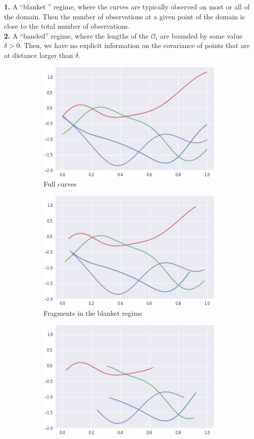 \documentclass[10pt, a4paper]{report}
\theoremstyle{definition}
\theoremstyle{remark}
\begin{document}
\noindent
\textbf{1.} A ``blanket '' regime, where the curves are typically observed on most or all of the domain. Then the number of observations at a given point of the domain is close to the total number of observations.\\
\textbf{2.} A ``banded'' regime, where the lengths of the $\mathcal{O}_i$ are bounded by some value $\delta>0$. Then, we have no explicit information on the covariance of points that are at distance larger than $\delta$.
\begin{figure}[ht]
	\centering
	\begin{subfigure}{.3\textwidth}
		\centering
		\includegraphics[width=.8\linewidth]{Code/images/21/full}
		\caption{Full curves}
	\end{subfigure}%
	\begin{subfigure}{.3\textwidth}
		\centering
		\includegraphics[width=.8\linewidth]{Code/images/21/blanket}
		\caption{\centering Fragments in the blanket regime}
	\end{subfigure}
	\begin{subfigure}{.3\textwidth}
		\centering
		\includegraphics[width=.8\linewidth]{Code/images/21/frags}

\end{subfigure}
\end{figure}
\end{document}
